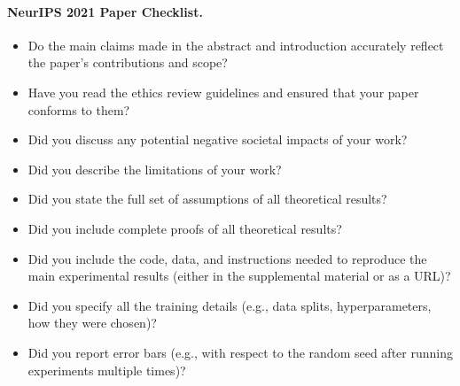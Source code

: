 \paragraph{NeurIPS 2021 Paper Checklist.}

\begin{itemize}
    \item 
    Do the main claims made in the abstract and introduction accurately reflect the paper's contributions and scope?
    
    
    \item
    Have you read the ethics review guidelines and ensured that your paper conforms to them?
    
    \answerYes{}
    
    \item
    Did you discuss any potential negative societal impacts of your work?
    
    \answerTODO{}
    
    \item
    Did you describe the limitations of your work?
    
    
    \item
    Did you state the full set of assumptions of all theoretical results?
    
    
    \item
    Did you include complete proofs of all theoretical results?
    
    
    \item
    Did you include the code, data, and instructions needed to reproduce the main experimental results (either in the supplemental material or as a URL)?
    
    
    \item
    Did you specify all the training details (e.g., data splits, hyperparameters, how they were chosen)?
    
    
    \item
    Did you report error bars (e.g., with respect to the random seed after running experiments multiple times)?
    

\end{itemize}
